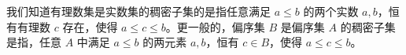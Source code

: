 
我们知道有理数集是实数集的稠密子集的是指任意满足 $a\leq b$ 的两个实数 $a,b$，恒有有理数 $c$ 存在，使得 $a\leq c\leq b$。更一般的，偏序集 $B$ 是偏序集 $A$ 的稠密子集是指，任意 $A$ 中满足 $a\leq b$ 的两元素 $a,b$，恒有 $c\in B$，使得 $a\leq c\leq b$。